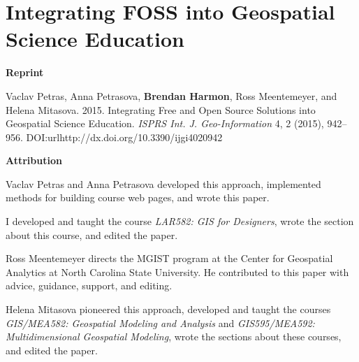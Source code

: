 \chapter[Integrating Free and Open Source Solutions into Geospatial Science Education]
{Integrating FOSS into Geospatial Science Education}
\label{app-b}

\textbf{Reprint}

Vaclav Petras, Anna Petrasova, \textbf{Brendan Harmon}, Ross Meentemeyer, and Helena Mitasova. 2015. Integrating Free and Open Source Solutions into Geospatial Science Education. \emph{ISPRS Int. J. Geo-Information} 4, 2 (2015), 942–956. DOI:url{http://dx.doi.org/10.3390/ijgi4020942}

\textbf{Attribution}

Vaclav Petras and Anna Petrasova
developed this approach,
implemented methods 
for building course web pages,
and wrote this paper.

I developed and taught the course 
\emph{LAR582: GIS for Designers},
wrote the section about this course,
and edited the paper.

Ross Meentemeyer
directs the MGIST program at the Center for Geospatial Analytics at
North Carolina State University. 
He contributed to this paper with advice, guidance, support, and editing.

Helena Mitasova
pioneered this approach,
developed and taught the courses 
\emph{GIS/MEA582: Geospatial Modeling and Analysis} and
\emph{GIS595/MEA592: Multidimensional Geospatial Modeling},
wrote the sections about these courses,
and edited the paper.

\vfil
\pagebreak

%


